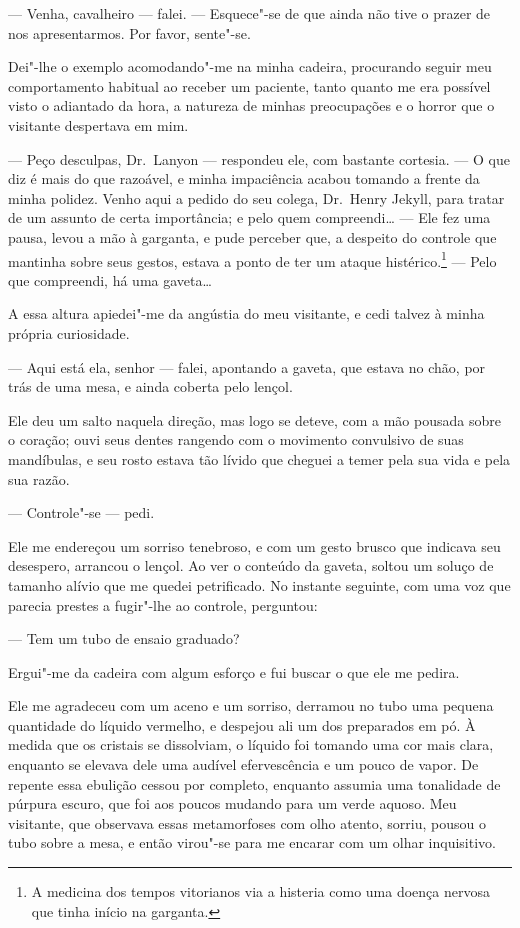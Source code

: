 --- Venha, cavalheiro --- falei. --- Esquece"-se de que ainda não tive o
prazer de nos apresentarmos.  Por favor, sente"-se.

Dei"-lhe o exemplo acomodando"-me na minha cadeira, procurando seguir meu
comportamento habitual ao receber um paciente, tanto quanto me era
possível visto o adiantado da hora, a natureza de minhas preocupações e
o horror que o visitante despertava em mim.

--- Peço desculpas, Dr.~Lanyon --- respondeu ele, com bastante cortesia. ---
O que diz é mais do que razoável, e minha impaciência acabou tomando a
frente da minha polidez.  Venho aqui a pedido do seu colega, Dr.~Henry
Jekyll, para tratar de um assunto de certa importância; e pelo quem
compreendi\ldots{} --- Ele fez uma pausa, levou a mão à garganta, e pude
perceber que, a despeito do controle que mantinha sobre seus gestos,
estava a ponto de ter um ataque histérico.\footnote{ A medicina
dos tempos vitorianos via a histeria como uma doença nervosa
que tinha início na garganta.} ---
Pelo que compreendi, há uma gaveta\ldots{}

A essa altura apiedei"-me da angústia do meu visitante, e cedi talvez à
minha própria curiosidade.

--- Aqui está ela, senhor --- falei, apontando a gaveta, que estava no
chão, por trás de uma mesa, e ainda coberta pelo lençol.

Ele deu um salto naquela direção, mas logo se deteve, com a mão pousada
sobre o coração; ouvi seus dentes rangendo com o movimento convulsivo
de suas mandíbulas, e seu rosto estava tão lívido que cheguei a temer
pela sua vida e pela sua razão.

--- Controle"-se --- pedi.

Ele me endereçou um sorriso tenebroso, e com um gesto brusco que
indicava seu desespero, arrancou o lençol.  Ao ver o conteúdo da
gaveta, soltou um soluço de tamanho alívio que me quedei petrificado. 
No instante seguinte, com uma voz que parecia prestes a fugir"-lhe ao
controle, perguntou:

--- Tem um tubo de ensaio graduado?

Ergui"-me da cadeira com algum esforço e fui buscar o que ele me pedira.

Ele me agradeceu com um aceno e um sorriso, derramou no tubo uma pequena
quantidade do líquido vermelho, e despejou ali um dos preparados em pó.
 À medida que os cristais se dissolviam, o líquido foi tomando uma cor
mais clara, enquanto se elevava dele uma audível efervescência e um
pouco de vapor.  De repente essa ebulição cessou por completo, enquanto
assumia uma tonalidade de púrpura escuro, que foi aos poucos mudando
para um verde aquoso.  Meu visitante, que observava essas metamorfoses
com olho atento, sorriu, pousou o tubo sobre a mesa, e então virou"-se
para me encarar com um olhar inquisitivo.

